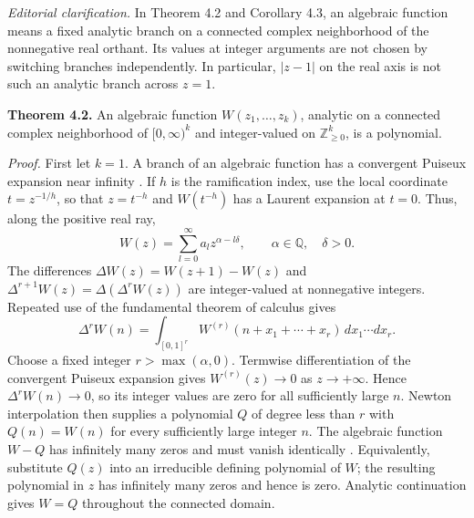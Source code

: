 \documentclass[10pt,letterpaper]{article}
\newcommand{\origpage}[1]{\marginnote{\footnotesize\textbf{[#1]}}}
\newcommand{\Nzero}{\mathbb{Z}_{\geq 0}}
\newcommand{\statement}[1]{\par\medskip\noindent\textbf{#1}\enspace}
\newcommand{\ednote}[1]{\par\smallskip\noindent\textit{Editorial clarification.} #1\par\smallskip}
\begin{document}
\ednote{In Theorem 4.2 and Corollary 4.3, an algebraic function means a fixed analytic branch
on a connected complex neighborhood of the nonnegative real orthant. Its values at integer
arguments are not chosen by switching branches independently. In particular,
$|z-1|$ on the real axis is not such an analytic branch across $z=1$.}

\statement{Theorem 4.2.} An algebraic function $W(z_1,\ldots,z_k)$, analytic on a connected complex
neighborhood of $[0,\infty)^k$ and integer-valued on $\Nzero^k$, is a polynomial.

\textit{Proof.} First let $k=1$. A branch of an algebraic function has a convergent
Puiseux expansion near infinity \cite{ref19}. If $h$ is the ramification index,
use the local coordinate $t=z^{-1/h}$, so that $z=t^{-h}$ and $W(t^{-h})$
has a Laurent expansion at $t=0$. Thus, along the positive real ray,
\begin{equation*}
W(z)=\sum_{l=0}^{\infty}a_l z^{\alpha-l\delta},\qquad
\alpha\in\mathbb Q,\quad\delta>0.\tag{1}
\end{equation*}
The differences $\Delta W(z)=W(z+1)-W(z)$ and
$\Delta^{r+1}W(z)=\Delta(\Delta^rW(z))$ are integer-valued at nonnegative integers.
Repeated use of the fundamental theorem of calculus gives
\begin{equation*}
\Delta^rW(n)=\int_{[0,1]^r}
W^{(r)}(n+x_1+\cdots+x_r)\,dx_1\cdots dx_r.\tag{2}
\end{equation*}
Choose a fixed integer $r>\max(\alpha,0)$. Termwise differentiation of the convergent
Puiseux expansion gives $W^{(r)}(z)\to0$ as $z\to+\infty$.
Hence $\Delta^rW(n)\to0$, so its integer values are zero for all sufficiently large $n$.
Newton interpolation then supplies a polynomial $Q$ of degree less than $r$
with $Q(n)=W(n)$ for every sufficiently large integer $n$.
The algebraic function $W-Q$ has infinitely many zeros and must vanish identically \cite{ref17}.
Equivalently, substitute $Q(z)$ into an irreducible defining polynomial of $W$;
the resulting polynomial in $z$ has infinitely many zeros and hence is zero.
\origpage{463}Analytic continuation gives $W=Q$ throughout the connected domain.
\end{document}
